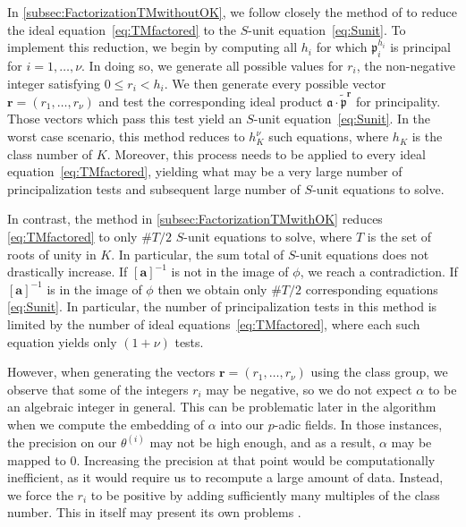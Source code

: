 In \autoref{subsec:FactorizationTMwithoutOK}, we follow closely the method of  to reduce the ideal equation~\eqref{eq:TMfactored} to the $S$-unit equation~\eqref{eq:Sunit}. To implement this reduction, we begin by computing all $h_i$ for which $\mathfrak{p}_i^{h_i}$ is principal for $i = 1, \dots, \nu$. In doing so, we generate all possible values for $r_i$, the non-negative integer satisfying $0 \leq r_i < h_i$. We then generate every possible vector $\mathbf{r} = (r_1, \dots, r_{\nu})$ and test the corresponding ideal product $\mathfrak{a} \cdot \tilde{\mathfrak{p}}^{\mathbf{r}}$ for principality. Those vectors which pass this test yield an $S$-unit equation~\eqref{eq:Sunit}. In the worst case scenario, this method reduces to $h_K^{\nu}$ such equations, where $h_K$ is the class number of $K$. Moreover, this process needs to be applied to every ideal equation~\eqref{eq:TMfactored}, yielding what may be a very large number of principalization tests and subsequent large number of $S$-unit equations to solve. 

In contrast, the method in \autoref{subsec:FactorizationTMwithOK} reduces \eqref{eq:TMfactored} to only $\#T/2$ $S$-unit equations to solve, where $T$ is the set of roots of unity in $K$. In particular, the sum total of $S$-unit equations does not drastically increase. If $[\mathbf{a}]^{-1}$ is not in the image of $\phi$, we reach a contradiction. If $[\mathbf{a}]^{-1}$ is in the image of $\phi$ then we obtain only $\#T/2$ corresponding equations \eqref{eq:Sunit}. In particular, the number of principalization tests in this method is limited by the number of ideal equations~\eqref{eq:TMfactored}, where each such equation yields only $(1+\nu)$ tests. 

However, when generating the vectors $\mathbf{r} = (r_1, \dots, r_{\nu})$ using the class group, we observe that some of the integers $r_i$ may be negative, so we do not expect $\alpha$ to be an algebraic integer in general. This can be problematic later in the algorithm when we compute the embedding of $\alpha$ into our $p$-adic fields. In those instances, the precision on our $\theta^{(i)}$ may not be high enough, and as a result, $\alpha$ may be mapped to $0$. Increasing the precision at that point would be computationally inefficient, as it would require us to recompute a large amount of data. Instead, we force the $r_i$ to be positive by adding sufficiently many multiples of the class number. This in itself may present its own problems .

